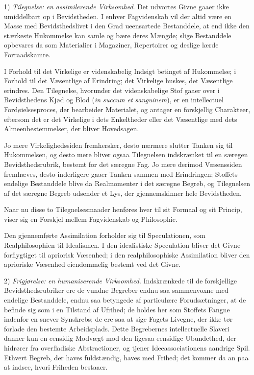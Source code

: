 \documentclass[12pt]{book}
\newcommand{\opage}[1]{\marginnote{\footnotesize\textit{[#1]}}}
\begin{document}
1) \emph{Tilegnelse: en assimilerende Virksomhed}. Det udvortes Givne gaaer ikke umiddelbart
op i Bevidstheden. I enhver Fagvidenskab vil der altid være en Masse med Bevidsthedslivet i
den Grad ueensartede Bestanddele, at end ikke den stærkeste Hukommelse kan samle og bære
deres Mængde; slige Bestanddele opbevares da som Materialier i Magaziner, Repertoirer og
deslige lærde Forraadskamre.

I Forhold til det Virkelige er videnskabelig Indsigt betinget af Hukommelse; i Forhold til
det Væsentlige af Erindring; det Virkelige huskes, det Væsentlige erindres. Den Tilegnelse,
hvorunder det videnskabelige Stof gaaer over i Bevidsthedens Kjød og Blod (\textit{in succum
et sanguinem}), er en intellectuel Fordøielsesproces, der bearbeider Materialet, og antager
en forskjellig Charakteer, eftersom det er det
\opage{113} Virkelige i dets Enkeltheder eller det Væsentlige med dets Almeenbestemmelser, der bliver
Hovedsagen.

Jo mere Virkelighedssiden fremhersker, desto nærmere slutter Tanken sig til Hukommelsen, og
desto mere bliver ogsaa Tilegnelsen indskrænket til en særegen Bevidsthedsrubrik, bestemt
for det særegne Fag. Jo mere derimod Væsenssiden fremhæves, desto inderligere gaaer Tanken
sammen med Erindringen; Stoffets endelige Bestanddele blive da Realmomenter i det særegne
Begreb, og Tilegnelsen af det særegne Begreb udsender et Lys, der gjennemskinner hele
Bevidstheden.

Naar nu disse to Tilegnelsesmaader henføres hver til sit Formaal og sit Princip, viser sig
en Forskjel mellem Fagvidenskab og Philosophie.

Den gjennemførte Assimilation forholder sig til Speculationen, som Realphilosophien til
Idealismen. I den idealistiske Speculation bliver det Givne forflygtiget til apriorisk
Væsenhed; i den realphilosophiske Assimilation bliver den aprioriske Væsenhed eiendommelig
bestemt ved det Givne.

2) \emph{Frigjørelse: en humaniserende Virksomhed}. Indskrænkede til de forskjellige
Bevidsthedsrubriker ere de vundne Begreber endnu saa sammenvoxne med endelige Bestanddele,
endnu saa betyngede af particulære Forudsætninger, at de befinde sig som i en Tilstand af
Ufrihed; de holdes her som Stoffets Fangne indenfor en snever Synskrebs; de ere saa at sige
Fagets Livegne, der ikke tør forlade den bestemte Arbeidsplads. Dette Begrebernes
intellectuelle Slaveri danner kun en eensidig Modvægt mod den ligesaa eensidige Ubundethed,
der hidrører fra overfladiske Abstractioner, og tjener Ideeassociationens aandrige Spil.
Ethvert Begreb, der haves fuldstændig, haves med Frihed; det kommer da an paa at indsee,
hvori Friheden bestaaer.
\end{document}
